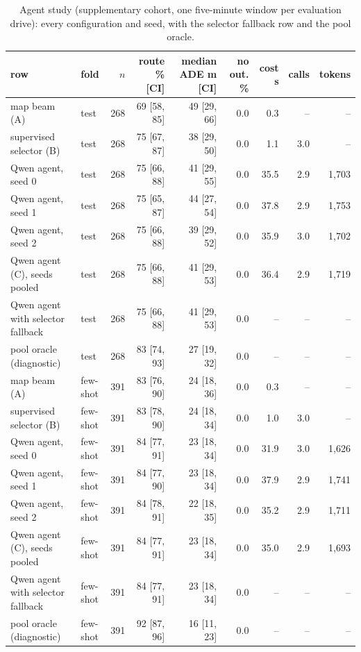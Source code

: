 \begin{table}[t]\centering\scriptsize\setlength{\tabcolsep}{3pt}
\caption{Agent study (supplementary cohort, one five-minute window per evaluation drive): every configuration and seed, with the selector fallback row and the pool oracle.}\label{tab:supp_agent}
\begin{tabular}{p{}lrrrrrrr}\toprule
row & fold & $n$ & route \% [CI] & median ADE m [CI] & no out. \% & cost s & calls & tokens \\\midrule
map beam (A) & test & 268 & 69 [58, 85] & 49 [29, 66] & 0.0 & 0.3 & -- & -- \\
supervised selector (B) & test & 268 & 75 [67, 87] & 38 [29, 50] & 0.0 & 1.1 & 3.0 & -- \\
Qwen agent, seed 0 & test & 268 & 75 [66, 88] & 41 [29, 55] & 0.0 & 35.5 & 2.9 & 1{,}703 \\
Qwen agent, seed 1 & test & 268 & 75 [65, 87] & 44 [27, 54] & 0.0 & 37.8 & 2.9 & 1{,}753 \\
Qwen agent, seed 2 & test & 268 & 75 [66, 88] & 39 [29, 52] & 0.0 & 35.9 & 3.0 & 1{,}702 \\
Qwen agent (C), seeds pooled & test & 268 & 75 [66, 88] & 41 [29, 53] & 0.0 & 36.4 & 2.9 & 1{,}719 \\
Qwen agent with selector fallback & test & 268 & 75 [66, 88] & 41 [29, 53] & 0.0 & -- & -- & -- \\
pool oracle (diagnostic) & test & 268 & 83 [74, 93] & 27 [19, 32] & 0.0 & -- & -- & -- \\
map beam (A) & few-shot & 391 & 83 [76, 90] & 24 [18, 36] & 0.0 & 0.3 & -- & -- \\
supervised selector (B) & few-shot & 391 & 83 [78, 90] & 24 [18, 34] & 0.0 & 1.0 & 3.0 & -- \\
Qwen agent, seed 0 & few-shot & 391 & 84 [77, 91] & 23 [18, 34] & 0.0 & 31.9 & 3.0 & 1{,}626 \\
Qwen agent, seed 1 & few-shot & 391 & 84 [77, 90] & 23 [18, 34] & 0.0 & 37.9 & 2.9 & 1{,}741 \\
Qwen agent, seed 2 & few-shot & 391 & 84 [78, 91] & 22 [18, 35] & 0.0 & 35.2 & 2.9 & 1{,}711 \\
Qwen agent (C), seeds pooled & few-shot & 391 & 84 [77, 91] & 23 [18, 34] & 0.0 & 35.0 & 2.9 & 1{,}693 \\
Qwen agent with selector fallback & few-shot & 391 & 84 [77, 91] & 23 [18, 34] & 0.0 & -- & -- & -- \\
pool oracle (diagnostic) & few-shot & 391 & 92 [87, 96] & 16 [11, 23] & 0.0 & -- & -- & -- \\
\bottomrule\end{tabular}
\end{table}
